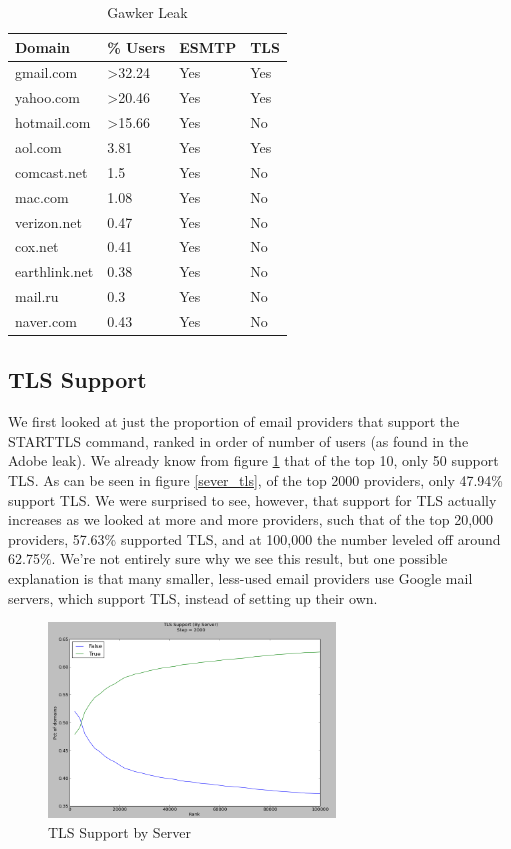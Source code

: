 \begin{table}
    \caption{Gawker Leak}
    \centering
    \label{table:gawker}
    \begin{tabular}{|l|l|l|l|}
        \hline
        Domain & \% Users & ESMTP & TLS \\
        \hline
            gmail.com & \textgreater32.24 & Yes & Yes \\
            yahoo.com & \textgreater20.46 & Yes & Yes \\
            hotmail.com & \textgreater15.66 & Yes & No \\
            aol.com & 3.81 & Yes & Yes \\
            comcast.net & 1.5 & Yes & No \\
            mac.com & 1.08 & Yes & No \\
            verizon.net & 0.47 & Yes & No \\
            cox.net & 0.41 & Yes & No \\
            earthlink.net & 0.38 & Yes & No \\
            mail.ru & 0.3 & Yes & No \\
            naver.com & 0.43 & Yes & No \\
        \hline
    \end{tabular}
\end{table}

\subsection{TLS Support}
We first looked at just the proportion of email providers that support the 
STARTTLS command, ranked in order of number of users (as found in the Adobe 
leak).  We already know from figure \ref{server_tls} that of the top 10, only 50%
support TLS.  As can be seen in figure \ref{sever_tls}, of the top 2000 providers, 
only 47.94\% support TLS.  We were surprised to see, however, that support for 
TLS actually increases as we looked at more and more providers, such that of the 
top 20,000 providers, 57.63\% supported TLS, and at 100,000 the number leveled 
off around 62.75\%.  We’re not entirely sure why we see this result, but one 
possible explanation is that many smaller, less-used email providers use Google 
mail servers, which support TLS, instead of setting up their own.

\begin{figure}
    \includegraphics[width=3.0in]{images/server_tls.png}
    \caption{TLS Support by Server}
    \label{server_tls}
\end{figure}

